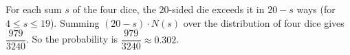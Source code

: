 For each sum $s$ of the four dice, the $20$-sided die exceeds it in $20-s$ ways (for $4\le s\le19$). Summing $(20-s)\cdot N(s)$ over the distribution of four dice gives $\dfrac{979}{3240}$. So the probability is $\boxed{\dfrac{979}{3240}}\approx0.302$.
